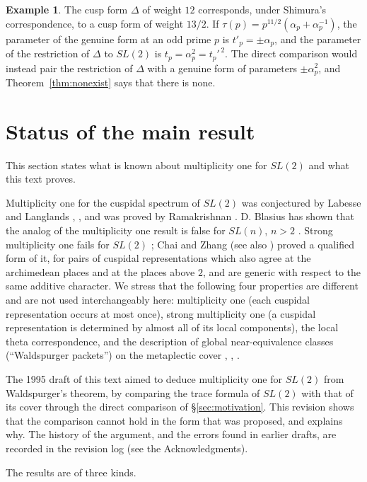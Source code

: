 \documentclass[12pt,letterpaper,openany]{book}
\theoremstyle{plain}
\theoremstyle{definition}
\newtheorem{example}[theorem]{Example}
\theoremstyle{remark}
\theoremstyle{remark}
\begin{document}
\begin{example}
The cusp form $\Delta$ of weight $12$ corresponds, under Shimura's
correspondence, to a cusp form of weight $13/2$. If
$\tau(p)=p^{11/2}(\alpha_p+\alpha_p^{-1})$, the parameter of the genuine
form at an odd prime $p$ is $t'_p=\pm\alpha_p$, and the parameter of the
restriction of $\Delta$ to $SL(2)$ is $t_p=\alpha_p^2=t_p'^{\,2}$. The
direct comparison would instead pair the restriction of $\Delta$ with a
genuine form of parameters $\pm\alpha_p^2$, and
Theorem~\ref{thm:nonexist} says that there is none.
\end{example}

\section{Status of the main result}

This section states what is known about multiplicity one for $SL(2)$ and
what this text proves.

Multiplicity one for the cuspidal spectrum of $SL(2)$ was conjectured
by Labesse and Langlands \cite{LL}, \cite{Lab}, and was proved by
Ramakrishnan \cite{Ra}. D. Blasius has shown that the analog of the
multiplicity one result is false for $SL(n)$, $n>2$ \cite{Blas}.
Strong multiplicity one fails for $SL(2)$ \cite{LL}; Chai and Zhang
\cite{CZ} (see also \cite{Zh}) proved a qualified form of it, for pairs
of cuspidal representations which also agree at the archimedean places
and at the places above $2$, and are generic with respect to the same
additive character. We stress that the following four
properties are different and are not used interchangeably here:
multiplicity one (each cuspidal representation occurs at most once),
strong multiplicity one (a cuspidal representation is determined by
almost all of its local components), the local theta correspondence,
and the description of global near-equivalence classes (``Waldspurger
packets'') on the metaplectic cover \cite{Wa1}, \cite{Wa2}, \cite{PS}.

The 1995 draft of this text aimed to deduce multiplicity one for $SL(2)$
from Waldspurger's theorem, by comparing the trace formula of $SL(2)$ with
that of its cover through the direct comparison of \S\ref{sec:motivation}.
This revision shows that the comparison cannot hold in
the form that was proposed, and explains why. The history of the argument, and the errors
found in earlier drafts, are recorded in the revision log (see the
Acknowledgments).

The results are of three kinds.
\end{document}
